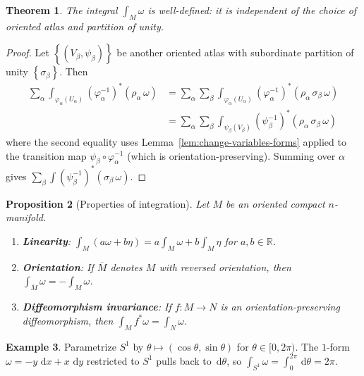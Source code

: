 \documentclass[12pt,a4paper,openany]{book}
\newtheorem{theorem}{Theorem}[section]
\newtheorem{proposition}[theorem]{Proposition}
\theoremstyle{definition}
\newtheorem{example}[theorem]{Example}
\theoremstyle{remark}
\newcommand{\R}{\mathbb{R}}
\newcommand{\dd}{\,\mathrm{d}}
\newcommand{\set}[1]{\left\{ #1 \right\}}
\begin{document}
\begin{theorem}\label{thm:integration-well-defined}
The integral $\int_M \omega$ is well-defined: it is independent of the
choice of oriented atlas and partition of unity.
\end{theorem}

\begin{proof}
Let $\set{(V_\beta, \psi_\beta)}$ be another oriented atlas with subordinate
partition of unity $\set{\sigma_\beta}$. Then
\begin{align*}
  \sum_\alpha \int_{\varphi_\alpha(U_\alpha)} (\varphi_\alpha^{-1})^*(\rho_\alpha\, \omega)
  &= \sum_\alpha \sum_\beta \int_{\varphi_\alpha(U_\alpha)} (\varphi_\alpha^{-1})^*(\rho_\alpha\, \sigma_\beta\, \omega) \\
  &= \sum_\alpha \sum_\beta \int_{\psi_\beta(V_\beta)} (\psi_\beta^{-1})^*(\rho_\alpha\, \sigma_\beta\, \omega)
\end{align*}
where the second equality uses Lemma~\ref{lem:change-variables-forms} applied
to the transition map $\psi_\beta \circ \varphi_\alpha^{-1}$
(which is orientation-preserving). Summing over $\alpha$ gives
$\sum_\beta \int (\psi_\beta^{-1})^*(\sigma_\beta\, \omega)$.
\end{proof}

\begin{proposition}[Properties of integration]\label{prop:integration-properties}
Let $M$ be an oriented compact $n$-manifold.
\begin{enumerate}[label=(\roman*)]
  \item \textbf{Linearity}: $\int_M (a\omega + b\eta) = a\int_M \omega + b\int_M \eta$
    for $a, b \in \R$.
  \item \textbf{Orientation}: If $\overline{M}$ denotes $M$ with reversed
    orientation, then $\int_{\overline{M}} \omega = -\int_M \omega$.
  \item \textbf{Diffeomorphism invariance}: If $f \colon M \to N$ is an
    orientation-preserving diffeomorphism, then
    $\int_M f^*\omega = \int_N \omega$.
\end{enumerate}
\end{proposition}

\begin{example}\label{ex:integration-circle}
Parametrize $S^1$ by $\theta \mapsto (\cos\theta, \sin\theta)$
for $\theta \in [0, 2\pi)$. The $1$-form
$\omega = -y\,\dd x + x\,\dd y$ restricted to $S^1$ pulls back to
$\dd\theta$, so $\int_{S^1} \omega = \int_0^{2\pi} \dd\theta = 2\pi$.
\end{example}
\end{document}
